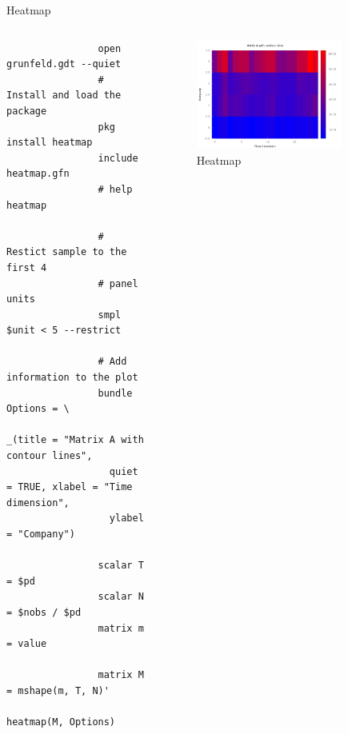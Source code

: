 \documentclass{beamer}[11pt]
\begin{document}
\begin{frame}[fragile]{Heatmap}
	\begin{columns}[T] %
		\scriptsize
		\begin{column}{.5\textwidth}
			\begin{verbatim}
				open grunfeld.gdt --quiet
				# Install and load the package
				pkg install heatmap
				include heatmap.gfn
				# help heatmap

				# Restict sample to the first 4
				# panel units
				smpl $unit < 5 --restrict

				# Add information to the plot
				bundle Options = \
				  _(title = "Matrix A with contour lines",
				  quiet = TRUE, xlabel = "Time dimension",
				  ylabel = "Company")

				scalar T = $pd
				scalar N = $nobs / $pd
				matrix m = value

				matrix M = mshape(m, T, N)'
				heatmap(M, Options)

			\end{verbatim}
		\end{column}

		\begin{column}{.5\textwidth}
			\begin{figure}
				\includegraphics[width=0.8\textwidth]{../figures/heatmap.png}
				\caption{Heatmap}
			\end{figure}
	  \end{column}
	\end{columns}
\end{frame}
\end{document}
